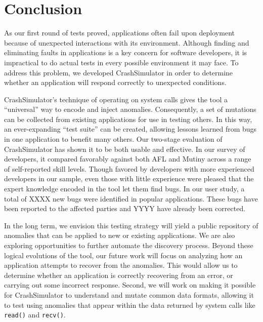 \section{Conclusion}
\label{SEC:conclusion}

As our first round of tests proved,
applications often fail upon deployment because of unexpected interactions
with its environment.
Although finding and eliminating
faults in applications is a key concern for software developers, it is
impractical to do actual tests in every possible
environment it may face.
To address this problem, we developed CrashSimulator
in order to determine whether an application will
respond correctly to unexpected conditions.

CrashSimulator's
technique of
operating on system calls gives the tool a ``universal'' way to
encode and inject anomalies. Consequently, a set of mutations can be
collected from existing applications for use in testing others.
In this way, an ever-expanding ``test suite'' can be
created, allowing lessons learned from bugs in one application to benefit
many others.
Our two-stage evaluation of CrashSimulator
has shown it to be both usable and
effective.  In our survey of developers, it compared favorably
against both AFL and Mutiny across a range of self-reported skill levels.
Though favored by developers with more experienced developers in our
sample, even those with little experience were pleased that
the expert knowledge encoded in the tool
let them find bugs.
In our user study, a total of
XXXX new bugs were identified in popular applications.
These bugs have been reported to the
affected parties and YYYY have already been corrected.

In the long term, we
envision this testing strategy will yield a public repository of anomalies
that can be applied to new or existing applications.
We are also exploring
opportunities to further automate the discovery process.
Beyond these logical
evolutions of the tool, our future work
will focus on analyzing how an
application attempts
to recover from the anomalies.  This would allow
us to determine whether
an application is correctly recovering
from an error, or carrying out some incorrect response.
Second, we will work on making it possible for CrashSimulator to
understand and mutate common data formats, allowing it to test using
anomalies that appear within the data returned by system calls like {\tt
read()} and {\tt recv()}.
